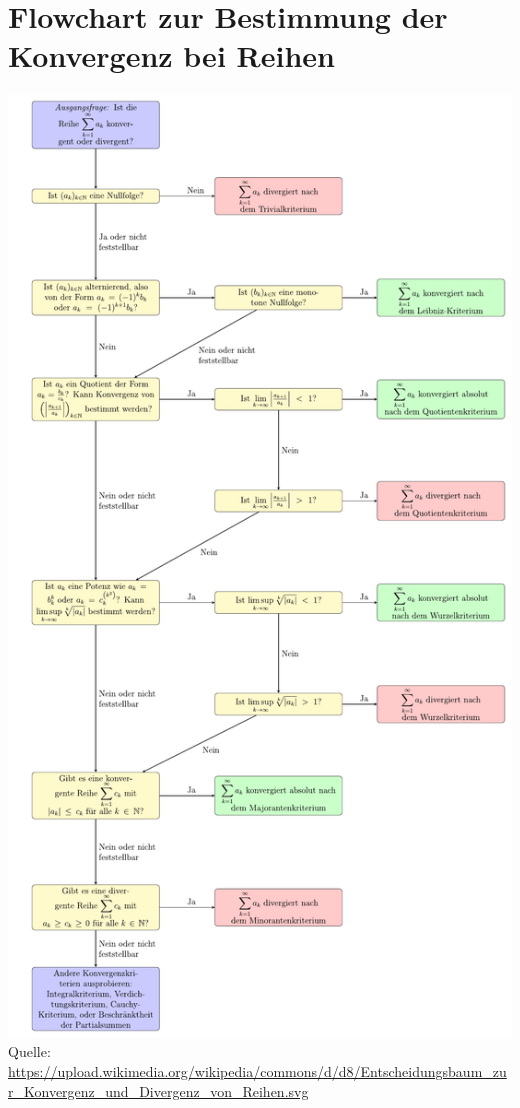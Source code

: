 \documentclass[halfparscip]{scrartcl}
\begin{document}
\section{Flowchart zur Bestimmung der Konvergenz bei Reihen}
	\includegraphics[width=.86\linewidth]{Konvergenz_bei_Reihen_bestimmen}
\\
\tiny
Quelle: \href{https://upload.wikimedia.org/wikipedia/commons/d/d8/Entscheidungsbaum_zur_Konvergenz_und_Divergenz_von_Reihen.svg}{https://upload.wikimedia.org/wikipedia/commons/d/d8/Entscheidungsbaum\_zur\_Konvergenz\_und\_Divergenz\_von\_Reihen.svg}
\end{document}
